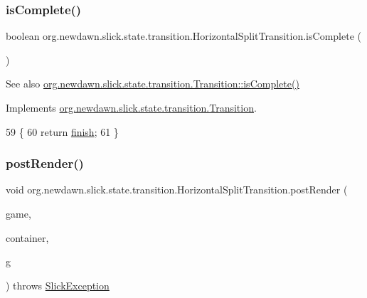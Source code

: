 \subsubsection{\texorpdfstring{is\+Complete()}{isComplete()}}
{\footnotesize\ttfamily boolean org.\+newdawn.\+slick.\+state.\+transition.\+Horizontal\+Split\+Transition.\+is\+Complete (\begin{DoxyParamCaption}{ }\end{DoxyParamCaption})\hspace{0.3cm}{\ttfamily [inline]}}

\begin{DoxySeeAlso}{See also}
\mbox{\hyperlink{interfaceorg_1_1newdawn_1_1slick_1_1state_1_1transition_1_1_transition_af397d5185cf09c30c3f51d5021d63815}{org.\+newdawn.\+slick.\+state.\+transition.\+Transition\+::is\+Complete()}} 
\end{DoxySeeAlso}


Implements \mbox{\hyperlink{interfaceorg_1_1newdawn_1_1slick_1_1state_1_1transition_1_1_transition_af397d5185cf09c30c3f51d5021d63815}{org.\+newdawn.\+slick.\+state.\+transition.\+Transition}}.


\begin{DoxyCode}
59                                 \{
60         \textcolor{keywordflow}{return} \mbox{\hyperlink{classorg_1_1newdawn_1_1slick_1_1state_1_1transition_1_1_horizontal_split_transition_a87c270ce19c400ee49306ba1c1fc9e63}{finish}};
61     \}
\end{DoxyCode}
\mbox{\label{classorg_1_1newdawn_1_1slick_1_1state_1_1transition_1_1_horizontal_split_transition_a285316f58e6bc93c6476e4c35b60268b}} 
\subsubsection{\texorpdfstring{post\+Render()}{postRender()}}
{\footnotesize\ttfamily void org.\+newdawn.\+slick.\+state.\+transition.\+Horizontal\+Split\+Transition.\+post\+Render (\begin{DoxyParamCaption}\item[{\mbox{\hyperlink{classorg_1_1newdawn_1_1slick_1_1state_1_1_state_based_game}{State\+Based\+Game}}}]{game,  }\item[{\mbox{\hyperlink{classorg_1_1newdawn_1_1slick_1_1_game_container}{Game\+Container}}}]{container,  }\item[{\mbox{\hyperlink{classorg_1_1newdawn_1_1slick_1_1_graphics}{Graphics}}}]{g }\end{DoxyParamCaption}) throws \mbox{\hyperlink{classorg_1_1newdawn_1_1slick_1_1_slick_exception}{Slick\+Exception}}\hspace{0.3cm}{\ttfamily [inline]}}

